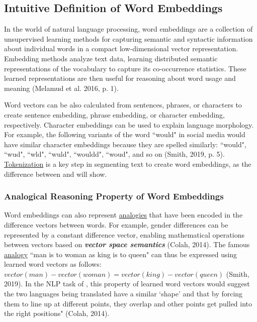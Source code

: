 \subsection{Intuitive Definition of Word Embeddings} \label{sec:WordEmb_Intuition}

In the world of natural language processing, word embeddings are a collection of unsupervised learning methods for capturing semantic and syntactic information about individual words in a compact low-dimensional vector representation. Embedding methods analyze text data, learning distributed semantic representations of the vocabulary to capture its co-occurrence statistics. These learned representations are then useful for reasoning about word usage and meaning (Melamud et al. 2016, p. 1). 

Word vectors can be also calculated from sentences, phrases, or characters to create sentence embedding, phrase embedding, or character embedding, respectively. Character embeddings can be used to explain language morphology. For example, the following variants of the word ``would" in social media would have similar character embeddings because they are spelled similarly: ``would", ``wud", ``wld", ``wuld", ``wouldd", ``woud", and so on (Smith, 2019, p. 5). \hyperref[nlptask:tokenization]{Tokenization} is a key step in segmenting text to create word embeddings, as the difference between  and  will show.  
 

\subsubsection{Analogical Reasoning Property of Word Embeddings} \label{sec:WordEmb_AnalogyFeature}

Word embeddings can also represent \hyperref[nlptask:wordanalogy]{analogies} that have been encoded in the difference vectors between words. For example, gender differences can be represented by a constant difference vector, enabling mathematical operations between vectors based on \textbf{\emph{vector space semantics}} (Colah, 2014). The famous \hyperref[nlptask:wordanalogy]{analogy} ``man is to woman as king is to queen" can thus be expressed using learned word vectors as follows: $vector(man) - vector(woman) = vector(king) - vector(queen)$ (Smith, 2019). In the NLP task of , this property of learned word vectors would suggest the two languages being translated have a similar `shape' and that by forcing them to line up at different points, they overlap and other points get pulled into the right positions" (Colah, 2014).

